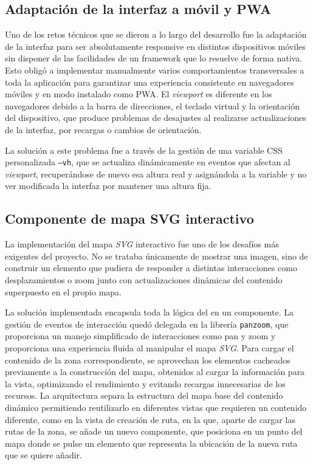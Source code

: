 \subsection{Adaptación de la interfaz a móvil y PWA}

Uno de los retos técnicos que se dieron a lo largo del desarrollo fue la adaptación de la interfaz para ser absolutamente responsive en distintos dispositivos móviles sin disponer de las facilidades de un framework que lo resuelve de forma nativa. Esto obligó a implementar manualmente varios comportamientos transversales a toda la aplicación para garantizar una experiencia consistente en navegadores móviles y en modo instalado como PWA. El \textit{viewport} es diferente en los navegadores debido a la barra de direcciones, el teclado virtual y la orientación del dispositivo, que produce problemas de desajustes al realizarse actualizaciones de la interfaz, por recargas o cambios de orientación.

La solución a este problema fue a través de la gestión de una variable CSS personalizada \texttt{--vh}, que se actualiza dinámicamente en eventos que afectan al \textit{viewport}, recuperándose de nuevo esa altura real y asignándola a la variable y no ver modificada la interfaz por mantener una altura fija.

\subsection{Componente de mapa SVG interactivo}

La implementación del mapa \textit{SVG} interactivo fue uno de los desafíos más exigentes del proyecto. No se trataba únicamente de mostrar una imagen, sino de construir un elemento que pudiera de responder a distintas interacciones como desplazamientos o zoom junto con actualizaciones dinámicas del contenido superpuesto en el propio mapa.

La solución implementada encapsula toda la lógica del en un componente. La gestión de eventos de interacción quedó delegada en la librería \texttt{panzoom}, que proporciona un manejo simplificado de interacciones como pan y zoom y proporciona una experiencia fluida al manipular el mapa \textit{SVG}. Para cargar el contenido de la zona correspondiente, se aprovechan los elementos cacheados previamente a la construcción del mapa, obtenidos al cargar la información para la vista, optimizando el rendimiento y evitando recargas innecesarias de los recursos. La arquitectura separa la estructura del mapa base del contenido dinámico permitiendo reutilizarlo en diferentes vistas que requieren un contenido diferente, como en la vista de creación de ruta, en la que, aparte de cargar las rutas de la zona, se añade un nuevo componente, que posiciona en un punto del mapa donde se pulse un elemento que representa la ubicación de la nueva ruta que se quiere añadir.

